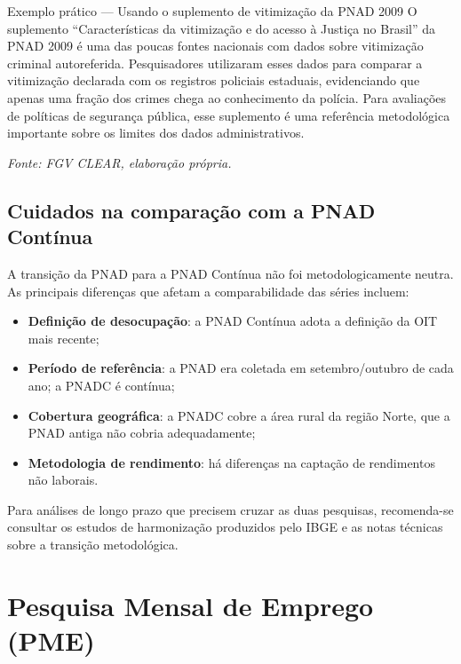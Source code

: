 \begin{boxexemplo}{Exemplo prático --- Usando o suplemento de vitimização da PNAD 2009}
O suplemento ``Características da vitimização e do acesso à Justiça no Brasil'' da PNAD 2009 é uma das poucas fontes nacionais com dados sobre vitimização criminal autoreferida. Pesquisadores utilizaram esses dados para comparar a vitimização declarada com os registros policiais estaduais, evidenciando que apenas uma fração dos crimes chega ao conhecimento da polícia. Para avaliações de políticas de segurança pública, esse suplemento é uma referência metodológica importante sobre os limites dos dados administrativos.

\textit{Fonte: FGV CLEAR, elaboração própria.}
\end{boxexemplo}

\subsection{Cuidados na comparação com a PNAD Contínua}

A transição da PNAD para a PNAD Contínua não foi metodologicamente neutra. As principais diferenças que afetam a comparabilidade das séries incluem:

\begin{itemize}
  \item \textbf{Definição de desocupação}: a PNAD Contínua adota a definição da OIT mais recente;
  \item \textbf{Período de referência}: a PNAD era coletada em setembro/outubro de cada ano; a PNADC é contínua;
  \item \textbf{Cobertura geográfica}: a PNADC cobre a área rural da região Norte, que a PNAD antiga não cobria adequadamente;
  \item \textbf{Metodologia de rendimento}: há diferenças na captação de rendimentos não laborais.
\end{itemize}

Para análises de longo prazo que precisem cruzar as duas pesquisas, recomenda-se consultar os estudos de harmonização produzidos pelo IBGE e as notas técnicas sobre a transição metodológica.

\section{Pesquisa Mensal de Emprego (PME)}

